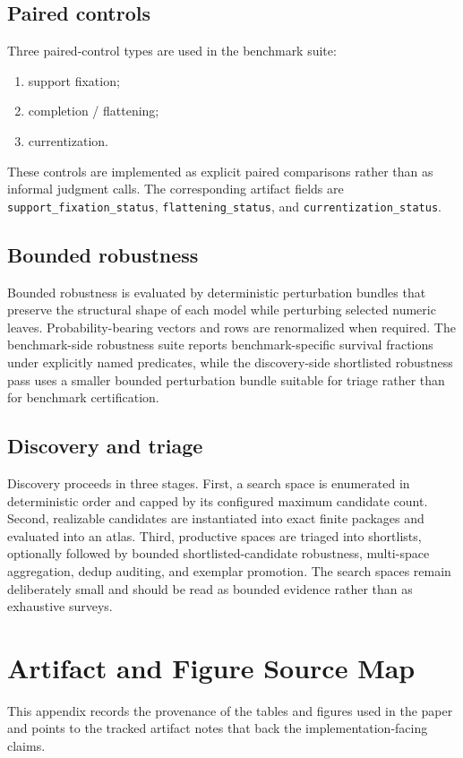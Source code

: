 \documentclass[11pt]{article}
\theoremstyle{definition}
\begin{document}
\subsection{Paired controls}\label{appsubsec:comp-controls}
Three paired-control types are used in the benchmark suite:
\begin{enumerate}
\item support fixation;
\item completion / flattening;
\item currentization.
\end{enumerate}
These controls are implemented as explicit paired comparisons rather than as informal judgment calls. The corresponding artifact fields are \texttt{support\_fixation\_status}, \texttt{flattening\_status}, and \texttt{currentization\_status}.

\subsection{Bounded robustness}\label{appsubsec:comp-robustness}
Bounded robustness is evaluated by deterministic perturbation bundles that preserve the structural shape of each model while perturbing selected numeric leaves. Probability-bearing vectors and rows are renormalized when required. The benchmark-side robustness suite reports benchmark-specific survival fractions under explicitly named predicates, while the discovery-side shortlisted robustness pass uses a smaller bounded perturbation bundle suitable for triage rather than for benchmark certification.

\subsection{Discovery and triage}\label{appsubsec:comp-discovery}
Discovery proceeds in three stages. First, a search space is enumerated in deterministic order and capped by its configured maximum candidate count. Second, realizable candidates are instantiated into exact finite packages and evaluated into an atlas. Third, productive spaces are triaged into shortlists, optionally followed by bounded shortlisted-candidate robustness, multi-space aggregation, dedup auditing, and exemplar promotion. The search spaces remain deliberately small and should be read as bounded evidence rather than as exhaustive surveys.

\section{Artifact and Figure Source Map}\label{app:artifact-map}
This appendix records the provenance of the tables and figures used in the paper and points to the tracked artifact notes that back the implementation-facing claims.
\end{document}
